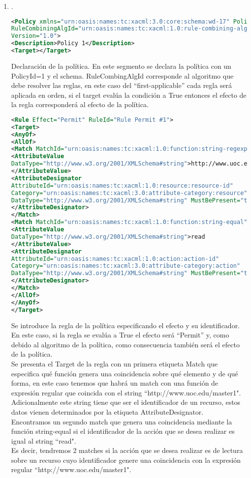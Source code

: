 \documentclass[10pt,a4paper]{article}
\begin{document}
\begin{enumerate}[label=\alph*]
\cite{oasis} \cite{brief} \cite{banking}

\item .

\begin{lstlisting}[language=XML]
<Policy xmlns="urn:oasis:names:tc:xacml:3.0:core:schema:wd-17" PolicyId="1"
RuleCombiningAlgId="urn:oasis:names:tc:xacml:1.0:rule-combining-algorithm:first-applicable"
Version="1.0">
<Description>Policy 1</Description>
<Target></Target>
\end{lstlisting}
Declaración de la política. En este segmento se declara la política con un PolicyId=1 y el schema. RuleCombingAlgId corresponde al algoritmo que debe resolver las reglas, en este caso del ``first-applicable'' cada regla será aplicada en orden, si el target evalúa la condición a True entonces el efecto de la regla corresponderá al efecto de la política. \cite{oasis}\pagebreak
\begin{lstlisting}[language=XML]
<Rule Effect="Permit" RuleId="Rule Permit #1">
<Target>
<AnyOf>
<AllOf>
<Match MatchId="urn:oasis:names:tc:xacml:1.0:function:string-regexp-match">
<AttributeValue
DataType="http://www.w3.org/2001/XMLSchema#string">http://www.uoc.edu/master1
</AttributeValue>
<AttributeDesignator
AttributeId="urn:oasis:names:tc:xacml:1.0:resource:resource-id"
Category="urn:oasis:names:tc:xacml:3.0:attribute-category:resource"
DataType="http://www.w3.org/2001/XMLSchema#string" MustBePresent="true">
</AttributeDesignator>
</Match>
<Match MatchId="urn:oasis:names:tc:xacml:1.0:function:string-equal">
<AttributeValue
DataType="http://www.w3.org/2001/XMLSchema#string">read
</AttributeValue>
<AttributeDesignator
AttributeId="urn:oasis:names:tc:xacml:1.0:action:action-id"
Category="urn:oasis:names:tc:xacml:3.0:attribute-category:action"
DataType="http://www.w3.org/2001/XMLSchema#string" MustBePresent="true">
</AttributeDesignator>
</Match>
</AllOf>
</AnyOf>
</Target>
\end{lstlisting}
Se introduce la regla de la política especificando el efecto y su identificador. En este caso, si la regla se evalúa a True el efecto será ``Permit'' y, como debido al algoritmo de la política, como consecuencia también será el efecto de la política.\\
Se presenta el Target de la regla con un primera etiqueta Match que especifica qué función genera una coincidencia sobre qué elemento y de qué forma, en este caso tenemos que habrá un match con una función de expresión regular que coincida con el string ``http://www.uoc.edu/master1". Adicionalmente este string tiene que ser el identificador de un recurso, estos datos vienen determinados por la etiqueta AttributeDesignator.\\
Encontramos un segundo match que genera una coincidencia mediante la función string-equal si el identificador de la acción que se desea realizar es igual al string ``read".\\
Es decir, tendremos 2 matches si la acción que se desea realizar es de lectura sobre un recurso cuyo identificador genere una coincidencia con la expresión regular ``http://www.uoc.edu/master1".


\end{enumerate}
\end{document}
